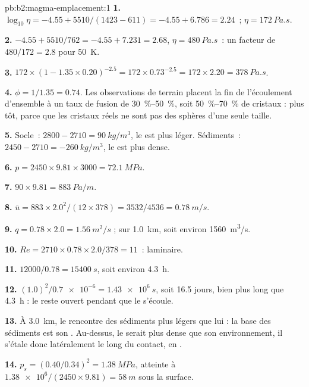 \begin{solution}{pb:b2:magma-emplacement:1}
\textbf{1.} $\log_{10}\eta = -4.55 + 5510/(1423 - 611) = -4.55 + 6.786 = 2.24$~;
$\eta = \qty{172}{Pa.s}$.

\textbf{2.} $-4.55 + 5510/762 = -4.55 + 7.231 = 2.68$, $\eta = \qty{480}{Pa.s}$~: un
facteur de $480/172 = 2.8$ pour \qty{50}{K}.

\textbf{3.} $172\times(1 - 1.35\times0.20)^{-2.5} = 172\times0.73^{-2.5} = 172\times2.20 =
\qty{378}{Pa.s}$.

\textbf{4.} $\phi = 1/1.35 = 0.74$. Les observations de terrain placent la fin de l'écoulement d'ensemble
à un taux de fusion de \qtyrange{30}{50}{\percent}, soit
\qtyrange{50}{70}{\percent} de cristaux : plus tôt, parce que les cristaux réels ne sont pas
des sphères d'une seule taille.

\textbf{5.} Socle~: $2800 - 2710 = \qty{90}{kg/m^3}$, le  est plus léger.
Sédiments~: $2450 - 2710 = \qty{-260}{kg/m^3}$, le  est plus dense.

\textbf{6.} $p = 2450\times9.81\times3000 = \qty{72.1}{MPa}$.

\textbf{7.} $90\times9.81 = \qty{883}{Pa/m}$.

\textbf{8.} $\bar u = 883\times2.0^2/(12\times378) = 3532/4536 = \qty{0.78}{m/s}$.

\textbf{9.} $q = 0.78\times2.0 = \qty{1.56}{m^2/s}$ ; sur \qty{1.0}{km}, soit environ
\qty{1560}{m^3/s}.

\textbf{10.} $Re = 2710\times0.78\times2.0/378 = 11$~: laminaire.

\textbf{11.} $12000/0.78 = \qty{15400}{s}$, soit environ \qty{4.3}{h}.

\textbf{12.} $(1.0)^2/\num{0.7e-6} = \qty{1.43e6}{s}$, soit 16.5 jours, bien plus long que
\qty{4.3}{h} : le  reste ouvert pendant que le  s'écoule.

\textbf{13.} À \qty{3.0}{km}, le  rencontre des sédiments plus légers que lui : la
base des sédiments est son . Au-dessus, le  serait
plus dense que son environnement, il s'étale donc latéralement le long du contact, en
.

\textbf{14.} $p_s = (0.40/0.34)^2 = \qty{1.38}{MPa}$, atteinte à
$\num{1.38e6}/(2450\times9.81) = \qty{58}{m}$ sous la surface.


\end{solution}
